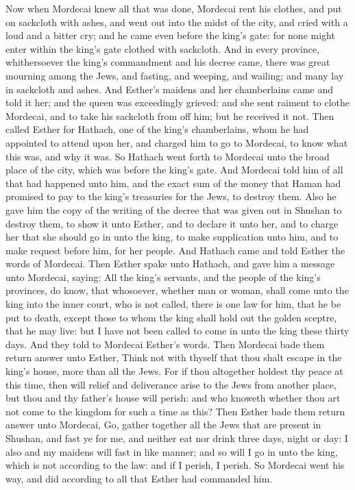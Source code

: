 Now when Mordecai knew all that was done, Mordecai rent his clothes, and put on sackcloth with ashes, and went out into the midst of the city, and cried with a loud and a bitter cry; and he came even before the king’s gate: for none might enter within the king’s gate clothed with sackcloth. And in every province, whithersoever the king’s commandment and his decree came, there was great mourning among the Jews, and fasting, and weeping, and wailing; and many lay in sackcloth and ashes.  And Esther’s maidens and her chamberlains came and told it her; and the queen was exceedingly grieved: and she sent raiment to clothe Mordecai, and to take his sackcloth from off him; but he received it not. Then called Esther for Hathach, one of the king’s chamberlains, whom he had appointed to attend upon her, and charged him to go to Mordecai, to know what this was, and why it was. So Hathach went forth to Mordecai unto the broad place of the city, which was before the king’s gate. And Mordecai told him of all that had happened unto him, and the exact sum of the money that Haman had promised to pay to the king’s treasuries for the Jews, to destroy them. Also he gave him the copy of the writing of the decree that was given out in Shushan to destroy them, to show it unto Esther, and to declare it unto her, and to charge her that she should go in unto the king, to make supplication unto him, and to make request before him, for her people.  And Hathach came and told Esther the words of Mordecai. Then Esther spake unto Hathach, and gave him a message unto Mordecai, saying: All the king’s servants, and the people of the king’s provinces, do know, that whosoever, whether man or woman, shall come unto the king into the inner court, who is not called, there is one law for him, that he be put to death, except those to whom the king shall hold out the golden sceptre, that he may live: but I have not been called to come in unto the king these thirty days. And they told to Mordecai Esther’s words.  Then Mordecai bade them return answer unto Esther, Think not with thyself that thou shalt escape in the king’s house, more than all the Jews. For if thou altogether holdest thy peace at this time, then will relief and deliverance arise to the Jews from another place, but thou and thy father’s house will perish: and who knoweth whether thou art not come to the kingdom for such a time as this? Then Esther bade them return answer unto Mordecai, Go, gather together all the Jews that are present in Shushan, and fast ye for me, and neither eat nor drink three days, night or day: I also and my maidens will fast in like manner; and so will I go in unto the king, which is not according to the law: and if I perish, I perish. So Mordecai went his way, and did according to all that Esther had commanded him. 

